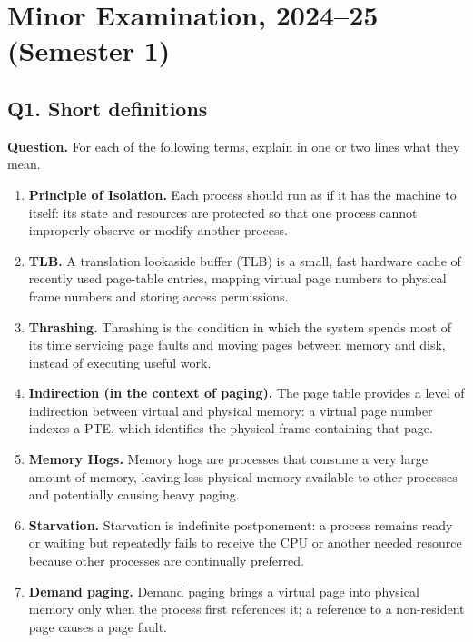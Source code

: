 \section{Minor Examination, 2024--25 (Semester 1)}

\subsection*{Q1. Short definitions}

\textbf{Question.}
For each of the following terms, explain in one or two lines what they mean.

\begin{enumerate}
\item[(i)] \textbf{Principle of Isolation.}
Each process should run as if it has the machine to itself: its state and resources are protected so that one process cannot improperly observe or modify another process.

\item[(ii)] \textbf{TLB.}
A translation lookaside buffer (TLB) is a small, fast hardware cache of recently used page-table entries, mapping virtual page numbers to physical frame numbers and storing access permissions.

\item[(iii)] \textbf{Thrashing.}
Thrashing is the condition in which the system spends most of its time servicing page faults and moving pages between memory and disk, instead of executing useful work.

\item[(iv)] \textbf{Indirection (in the context of paging).}
The page table provides a level of indirection between virtual and physical
memory: a virtual page number indexes a PTE, which identifies the physical
frame containing that page.

\item[(v)] \textbf{Memory Hogs.}
Memory hogs are processes that consume a very large amount of memory, leaving
less physical memory available to other processes and potentially causing
heavy paging.

\item[(vi)] \textbf{Starvation.}
Starvation is indefinite postponement: a process remains ready or waiting but repeatedly fails to receive the CPU or another needed resource because other processes are continually preferred.

\item[(vii)] \textbf{Demand paging.}
Demand paging brings a virtual page into physical memory only when the process first references it; a reference to a non-resident page causes a page fault.
\end{enumerate}

